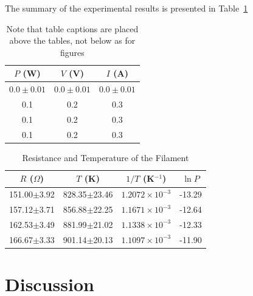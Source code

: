 \documentclass[11pt, a4paper]{article}
\begin{document}

The summary of the experimental results is presented in Table~\ref{tab:summary}

\begin{table}[htbp]
\caption{Note that table captions are placed above the tables, not below as for figures}
\label{tab:summary}
\begin{center}
\begin{tabular}{ccc}
\hline
 $P$ (W)      & $V$ (V)       & $I$ (A)   \\
\hline
$0.0\pm0.01$ & $0.0\pm0.01$ & $0.0\pm0.01$  \\
 0.1         & 0.2          &  0.3         \\
 0.1         & 0.2          &  0.3         \\
 0.1         & 0.2          &  0.3         \\

\hline
\end{tabular}
\end{center}
\end{table}


\begin{table}[htbp]
\caption{Resistance and Temperature of the Filament}
\label{tab:data}
\begin{center}
\begin{tabular}{|c||c|c|c|}
\hline
$R$ ($\Omega$) & $T$ (K) & $1/T$ (K$^{-1}$) & $\ln P$ \\
\hline\hline
151.00$\pm$3.92 & 828.35$\pm$23.46& $1.2072\times10^{-3}$& -13.29 \\ \hline
157.12$\pm$3.71 & 856.88$\pm$22.25& $1.1671\times10^{-3}$& -12.64 \\ \hline
162.53$\pm$3.49 & 881.99$\pm$21.02& $1.1338\times10^{-3}$& -12.33 \\ \hline
166.67$\pm$3.33 & 901.14$\pm$20.13& $1.1097\times10^{-3}$& -11.90 \\ \hline
\hline
\end{tabular}
\end{center}  
\end{table}

\section{Discussion}
\end{document}
